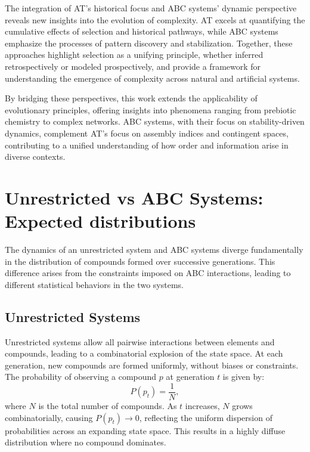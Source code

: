 \documentclass[entropy,article,submit,pdftex,oneauthor]{Definitions/mdpi}
\begin{document}
The integration of AT’s historical focus and ABC systems’ dynamic perspective reveals new insights into the evolution of complexity. AT excels at quantifying the cumulative effects of selection and historical pathways, while ABC systems emphasize the processes of pattern discovery and stabilization. Together, these approaches highlight selection as a unifying principle, whether inferred retrospectively or modeled prospectively, and provide a framework for understanding the emergence of complexity across natural and artificial systems.

By bridging these perspectives, this work extends the applicability of evolutionary principles, offering insights into phenomena ranging from prebiotic chemistry to complex networks. ABC systems, with their focus on stability-driven dynamics, complement AT’s focus on assembly indices and contingent spaces, contributing to a unified understanding of how order and information arise in diverse contexts.



\section{Unrestricted vs ABC Systems: Expected distributions}

The dynamics of an unrestricted system and ABC systems diverge fundamentally in the distribution of compounds formed over successive generations. This difference arises from the constraints imposed on ABC interactions, leading to different statistical behaviors in the two systems.

\subsection{Unrestricted Systems}

Unrestricted systems allow all pairwise interactions between elements and compounds, leading to a combinatorial explosion of the state space. At each generation, new compounds are formed uniformly, without biases or constraints. The probability of observing a compound \( p \) at generation \( t \) is given by:
\begin{equation}
P(p_t) = \frac{1}{N},
\end{equation}
where \( N \) is the total number of compounds. As \( t \) increases, \( N \) grows combinatorially, causing \( P(p_t) \to 0 \), reflecting the uniform dispersion of probabilities across an expanding state space. This results in a highly diffuse distribution where no compound dominates.
\end{document}
